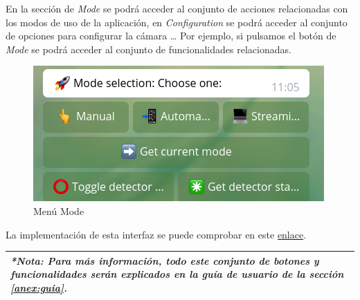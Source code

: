 En la sección de \textit{Mode} se podrá acceder al conjunto de acciones relacionadas con los modos de uso de la aplicación, en \textit{Configuration} se podrá acceder al conjunto de opciones para configurar la cámara \ldots
Por ejemplo, si pulsamos el botón de \textit{Mode} se podrá acceder al conjunto de funcionalidades relacionadas.

\begin{figure}[h]
	\centering
	\includegraphics[scale=0.8]{images/39}
	\caption{Menú Mode}
\end{figure}

La implementación de esta interfaz se puede comprobar en este \href{https://github.com/jmv74211/TFM_security_system_PI/blob/master/src/agents/telegram_bot.py#L972}{enlace}.

\begin{tabular}{|p{15.5cm}|}
	
	\hline
	
	\textit{ \textbf{*Nota:} Para más información, todo este conjunto de botones y funcionalidades serán explicados en la guía de usuario de la sección \ref{anex:guia}. }
	\\
	\hline
	
\end{tabular}

